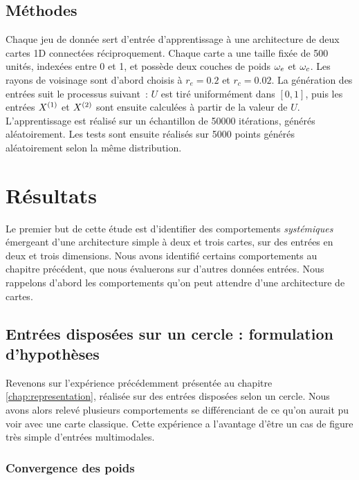 \documentclass[../main]{subfiles}
\begin{document}
\subsection{Méthodes}

Chaque jeu de donnée sert d'entrée d'apprentissage à une architecture de deux cartes 1D connectées réciproquement. Chaque carte a une taille fixée de 500 unités, indexées entre 0 et 1, et possède deux couches de poids $\omega_e$ et $\omega_c$. Les rayons de voisinage sont d'abord choisis à $r_e = 0.2$ et $r_c = 0.02$.
La génération des entrées suit le processus suivant~: $U$ est tiré uniformément dans $[0,1]$, puis les entrées $X^{({1})}$ et $X^{({2})}$ sont ensuite calculées à partir de la valeur de $U$.
L'apprentissage est réalisé sur un échantillon de 50000 itérations, générés aléatoirement. Les tests sont ensuite réalisés sur 5000 points générés aléatoirement selon la même distribution.

\section{Résultats}

Le premier but de cette étude est d'identifier des comportements \emph{systémiques} émergeant d'une architecture simple à deux et trois cartes, sur des entrées en deux et trois dimensions.
Nous avons identifié certains comportements au chapitre précédent, que nous évaluerons sur d'autres données entrées. Nous rappelons d'abord les comportements qu'on peut attendre d'une architecture de cartes.

\subsection{Entrées disposées sur un cercle : formulation d'hypothèses}

Revenons sur l'expérience précédemment présentée au chapitre \ref{chap:representation}, réalisée sur des entrées disposées selon un cercle. Nous avons alors relevé plusieurs comportements se différenciant de ce qu'on aurait pu voir avec une carte classique. Cette expérience a l'avantage d'être un cas de figure très simple d'entrées multimodales.

\subsubsection{Convergence des poids}
\end{document}

